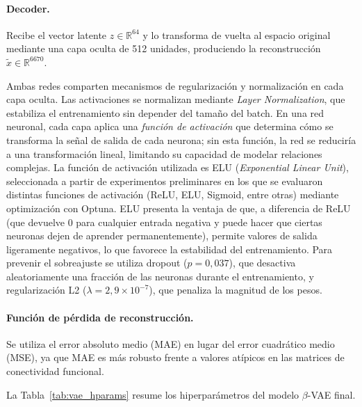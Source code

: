 \paragraph{Decoder.} Recibe el vector latente $z \in \mathbb{R}^{64}$ y lo transforma de vuelta al espacio original mediante una capa oculta de 512 unidades, produciendo la reconstrucción $\tilde{x} \in \mathbb{R}^{6670}$.

Ambas redes comparten mecanismos de regularización y normalización en cada capa oculta. Las activaciones se normalizan mediante \textit{Layer Normalization}, que estabiliza el entrenamiento sin depender del tamaño del batch. En una red neuronal, cada capa aplica una \textit{función de activación} que determina cómo se transforma la señal de salida de cada neurona; sin esta función, la red se reduciría a una transformación lineal, limitando su capacidad de modelar relaciones complejas. La función de activación utilizada es ELU (\textit{Exponential Linear Unit}), seleccionada a partir de experimentos preliminares en los que se evaluaron distintas funciones de activación (ReLU, ELU, Sigmoid, entre otras) mediante optimización con Optuna. ELU presenta la ventaja de que, a diferencia de ReLU (que devuelve 0 para cualquier entrada negativa y puede hacer que ciertas neuronas dejen de aprender permanentemente), permite valores de salida ligeramente negativos, lo que favorece la estabilidad del entrenamiento. Para prevenir el sobreajuste se utiliza dropout ($p = 0{,}037$), que desactiva aleatoriamente una fracción de las neuronas durante el entrenamiento, y regularización L2 ($\lambda = 2{,}9 \times 10^{-7}$), que penaliza la magnitud de los pesos.

\paragraph{Función de pérdida de reconstrucción.} Se utiliza el error absoluto medio (MAE) en lugar del error cuadrático medio (MSE), ya que MAE es más robusto frente a valores atípicos en las matrices de conectividad funcional.

La Tabla~\ref{tab:vae_hparams} resume los hiperparámetros del modelo $\beta$-VAE final.

